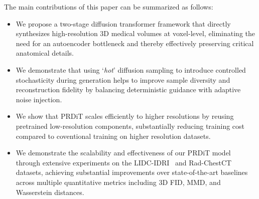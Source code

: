The main contributions of this paper can be summarized as follows:
\begin{itemize}[topsep=0pt]
\item We propose a two-stage diffusion transformer framework that directly synthesizes high-resolution 3D medical volumes at voxel-level, eliminating the need for an autoencoder bottleneck and thereby effectively preserving critical anatomical details.
\item We demonstrate that using `\emph{hot}' diffusion sampling to introduce controlled stochasticity during generation helps to improve sample diversity and reconstruction fidelity by balancing deterministic guidance with adaptive noise injection.
\item We show that PRDiT scales efficiently to higher resolutions by reusing pretrained low-resolution components, substantially reducing training cost compared to coventional training on higher resolution datasets.
\item We demonstrate the scalability and effectiveness of our PRDiT model through extensive experiments on the LIDC-IDRI~\citep{armato2011lung} and Rad-ChestCT~\citep{draelos2020rad} datasets, achieving substantial improvements over state-of-the-art baselines 
across multiple quantitative metrics including 3D FID, MMD, and Wasserstein distances.
\end{itemize}
